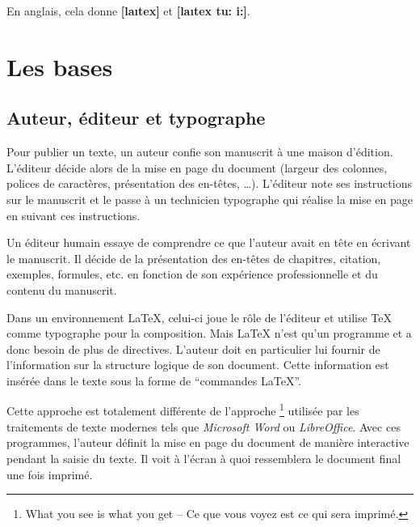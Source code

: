 En anglais, cela donne \textbf{[la\i{}tex]} et \textbf{[la\i{}tex tu:
i:]}.


% 

\section{Les bases}

\subsection{Auteur, éditeur et typographe}

Pour publier un texte, un auteur confie son manuscrit  à une maison
d'édition. L'éditeur décide alors de la mise en page du document
(largeur des colonnes, polices de caractères, présentation des
en-têtes, \dots). L'éditeur note ses instructions sur le manuscrit et
le passe à un technicien typographe qui réalise la mise en page
en suivant ces instructions.

Un éditeur humain essaye de comprendre ce que l'auteur avait en tête en
écrivant le manuscrit. Il décide de la présentation des en-têtes de chapitres,
citation, exemples, formules, etc. en fonction de son expérience
professionnelle et du contenu du manuscrit.

Dans un environnement \LaTeX{}, celui-ci joue le rôle de l'éditeur et
utilise \TeX{} comme typographe pour la composition. Mais \LaTeX{}
n'est qu'un programme et a donc besoin de plus de directives. L'auteur
doit en particulier lui fournir de l'information sur la structure logique de son
document. Cette information est insérée dans le texte sous la forme de
\enquote{commandes \LaTeX{}}.

Cette approche est totalement différente de l'approche
\footnote{What you see is what you get -- Ce que vous
voyez est ce qui sera imprimé.}  utilisée par les traitements de texte
modernes tels que \emph{\mbox{Microsoft} \mbox{Word}} ou
\emph{\mbox{LibreOffice}}. Avec ces programmes, l'auteur définit la
mise en page du document de manière interactive pendant la saisie du
texte. Il voit à l'écran à quoi ressemblera le document final une fois
imprimé.

